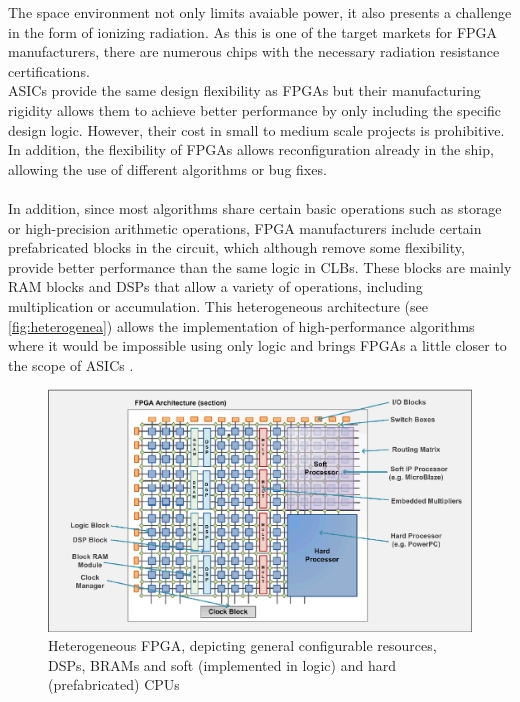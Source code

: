 \pagebreak

The space environment not only limits avaiable power, it also presents a challenge in the form of ionizing radiation. As this is one of the target markets for FPGA manufacturers, there are numerous chips with the necessary radiation resistance certifications.
\\
ASICs provide the same design flexibility as FPGAs but their manufacturing rigidity allows them to achieve better performance by only including the specific design logic. However, their cost in small to medium scale projects is prohibitive. In addition, the flexibility of FPGAs allows reconfiguration already in the ship, allowing the use of different algorithms or bug fixes.
\\
\\
In addition, since most algorithms share certain basic operations such as storage or high-precision arithmetic operations, FPGA manufacturers include certain prefabricated blocks in the circuit, which although remove some flexibility, provide better performance than the same logic in CLBs. These blocks are mainly RAM blocks and DSPs that allow a variety of operations, including multiplication or accumulation. This heterogeneous architecture (see \autoref{fig:heterogenea}) allows the implementation of high-performance algorithms where it would be impossible using only logic and brings FPGAs a little closer to the scope of ASICs \cite{zhou_efficient_2013}.
\begin{figure}[h!]
\centering
\includegraphics[width=5.7in]{figures/FPGA_heterogenea.png}
\caption[Overview of an heterogeneous FPGA]{Heterogeneous FPGA, depicting general configurable resources, DSPs, BRAMs and soft (implemented in logic) and hard (prefabricated) CPUs}
  \label{fig:heterogenea}
\end{figure}
\pagebreak
\\

